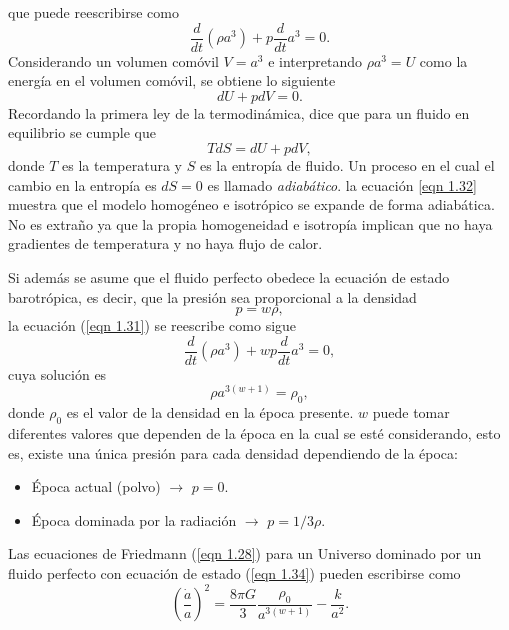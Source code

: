 \documentclass[a4paper,openright,12pt]{book}
\begin{document}
que puede reescribirse como
\begin{equation}
\frac{d}{dt} (\rho a^{3}) + p\frac{d}{dt}a^{3} = 0.\label{eqn 1.31}
\end{equation}
Considerando un volumen comóvil $V = a^{3}$ e interpretando $\rho a^{3} = U$ como la energía en el volumen comóvil, se obtiene lo siguiente
\begin{equation}
dU + pdV = 0. \label{eqn 1.32}
\end{equation}
Recordando la primera ley de la termodinámica, dice que para un fluido en equilibrio se cumple que 
\begin{equation}
TdS = dU +pdV, \label{eqn 1.33}
\end{equation}
donde $T$ es la temperatura y $S$ es la entropía de fluido. Un proceso en el cual el cambio en la entropía es $dS = 0$ es llamado \textit{adiabático}. la ecuación \ref{eqn 1.32} muestra que el modelo homogéneo e isotrópico se expande de forma adiabática. No es extraño ya que la propia homogeneidad e isotropía implican que no haya gradientes de temperatura y no haya flujo de calor.

Si además se asume que el fluido perfecto obedece la ecuación de estado barotrópica, es decir, que la presión sea proporcional a la densidad
\begin{equation}
p = w\rho, \label{eqn 1.34}
\end{equation}
la ecuación (\ref{eqn 1.31}) se reescribe como sigue
\begin{equation}
\frac{d}{dt}(\rho a^{3}) + w p \frac{d}{dt} a^{3} = 0,\label{eqn 1.35}
\end{equation}
cuya solución es
\begin{equation}
\rho a^{3(w + 1)} = \rho _{0}, \label{eqn 1.36}
\end{equation}
donde $\rho _{0}$ es el valor de la densidad en la época presente. $w$ puede tomar diferentes valores que dependen de la época en la cual se esté considerando, esto es, existe una única presión para cada densidad dependiendo de la época:
\begin{itemize}
\item Época actual (polvo) $\rightarrow$ $p=0$.
\item Época dominada por la radiación $\rightarrow$ $p = 1/3 \rho$.
\end{itemize}

Las ecuaciones de Friedmann (\ref{eqn 1.28}) para un Universo dominado por un fluido perfecto con ecuación de estado (\ref{eqn 1.34}) pueden escribirse como
\begin{equation}
\left(\frac{\dot{a}}{a}\right)^{2}
=
\frac{8 \pi G}{3} \frac{\rho _{0}}{a^{3(w + 1)}} - \frac{k}{a^{2}}.\label{eqn 1.37}
\end{equation}
\end{document}
